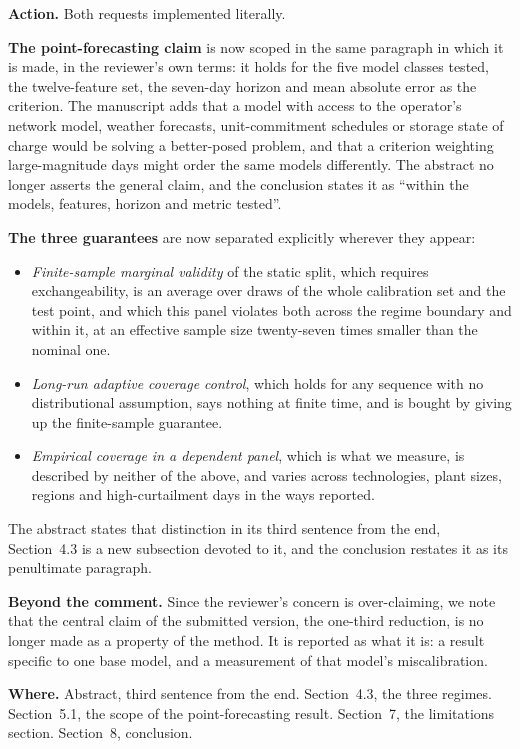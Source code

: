 \documentclass[11pt,a4paper]{article}
\newcommand{\action}[1]{\textbf{Action.} #1}
\newcommand{\where}[1]{\textbf{Where.} #1}
\begin{document}
\action{Both requests implemented literally.}

\textbf{The point-forecasting claim} is now scoped in the same paragraph in which it is made, in the reviewer's own terms: it holds for the five model classes tested, the twelve-feature set, the seven-day horizon and mean absolute error as the criterion. The manuscript adds that a model with access to the operator's network model, weather forecasts, unit-commitment schedules or storage state of charge would be solving a better-posed problem, and that a criterion weighting large-magnitude days might order the same models differently. The abstract no longer asserts the general claim, and the conclusion states it as ``within the models, features, horizon and metric tested''.

\textbf{The three guarantees} are now separated explicitly wherever they appear:

\begin{itemize}[leftmargin=1.4em,itemsep=2pt]
\item \emph{Finite-sample marginal validity} of the static split, which requires exchangeability, is an average over draws of the whole calibration set and the test point, and which this panel violates both across the regime boundary and within it, at an effective sample size twenty-seven times smaller than the nominal one.
\item \emph{Long-run adaptive coverage control}, which holds for any sequence with no distributional assumption, says nothing at finite time, and is bought by giving up the finite-sample guarantee.
\item \emph{Empirical coverage in a dependent panel}, which is what we measure, is described by neither of the above, and varies across technologies, plant sizes, regions and high-curtailment days in the ways reported.
\end{itemize}

The abstract states that distinction in its third sentence from the end, Section~4.3 is a new subsection devoted to it, and the conclusion restates it as its penultimate paragraph.

\textbf{Beyond the comment.} Since the reviewer's concern is over-claiming, we note that the central claim of the submitted version, the one-third reduction, is no longer made as a property of the method. It is reported as what it is: a result specific to one base model, and a measurement of that model's miscalibration.

\where{Abstract, third sentence from the end. Section~4.3, the three regimes. Section~5.1, the scope of the point-forecasting result. Section~7, the limitations section. Section~8, conclusion.}
\end{document}
